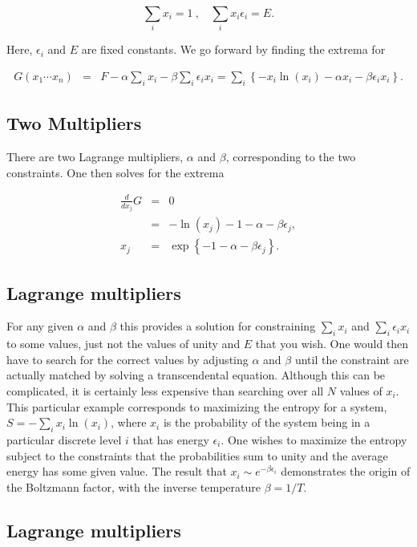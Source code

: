 \documentclass[%
oneside,                 %
final,                   %
10pt]{article}
\begin{document}
\[
\sum_ix_i=1~,~~~~\sum_ix_i\epsilon_i=E.
\]

Here, $\epsilon_i$ and $E$ are fixed constants. We go forward by
finding the extrema for

\begin{eqnarray*}
G(x_1\cdots x_n)&=&F-\alpha\sum_i x_i-\beta\sum_i\epsilon_ix_i
=\sum_i \left\{-x_i\ln(x_i)-\alpha x_i-\beta\epsilon_ix_i\right\}.
\end{eqnarray*}

\subsection{Two Multipliers}

There are two Lagrange multipliers, $\alpha$ and $\beta$,
corresponding to the two constraints. One then solves for the extrema

\begin{eqnarray*}
\frac{d}{dx_j}G&=&0\\
&=&-\ln(x_j)-1-\alpha-\beta\epsilon_j,\\
x_j&=&\exp\left\{-1-\alpha-\beta\epsilon_j\right\}.
\end{eqnarray*}

\subsection{Lagrange multipliers}

For any given $\alpha$ and $\beta$ this provides a solution for
constraining $\sum_i x_i$ and $\sum_i\epsilon_ix_i$ to some values,
just not the values of unity and $E$ that you wish. One would then
have to search for the correct values by adjusting $\alpha$ and
$\beta$ until the constraint are actually matched by solving a
transcendental equation. Although this can be complicated, it is
certainly less expensive than searching over all $N$ values of
$x_i$. This particular example corresponds to maximizing the entropy
for a system, $S=-\sum_i x_i\ln(x_i)$, where $x_i$ is the probability
of the system being in a particular discrete level $i$ that has energy
$\epsilon_i$. One wishes to maximize the entropy subject to the
constraints that the probabilities sum to unity and the average energy
has some given value. The result that $x_i\sim e^{-\beta\epsilon_i}$
demonstrates the origin of the Boltzmann factor, with the inverse
temperature $\beta=1/T$.

\subsection{Lagrange multipliers}
\end{document}
